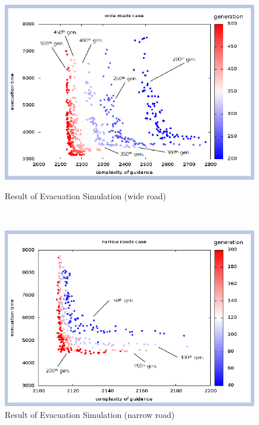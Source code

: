 \begin{figure}
  \begin{minipage}[c]{.49\linewidth}  %
  \centering
  \includegraphics[width=.99\linewidth]{Figs.noda/figure-11.evac_wide.eps}
  \caption{Result of Evacuation Simulation (wide road)}
  \label{fig:Figs.noda/figure-11.evac_wide.eps}
  \end{minipage}~
  \begin{minipage}[c]{.49\linewidth}  %
  \centering
  \includegraphics[width=.99\linewidth]{Figs.noda/figure-10.evac_narrow.eps}
  \caption{Result of Evacuation Simulation (narrow road)}
  \label{fig:Figs.noda/figure-10.evac_narrow.eps}
  \end{minipage}
\end{figure}


